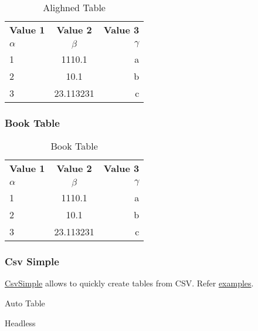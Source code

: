 \documentclass{report}[a4paper,12pt] %
\begin{document}
\begin{table}[h!]
  \begin{center}
    \caption{Alighned Table}
    \label{tab:alighned}
    \begin{tabular}{l|c|r} %
      \textbf{Value 1} & \textbf{Value 2} & \textbf{Value 3}\\
      $\alpha$ & $\beta$ & $\gamma$ \\
      \hline
      1 & 1110.1 & a\\
      2 & 10.1 & b\\
      3 & 23.113231 & c\\
    \end{tabular}
  \end{center}
\end{table}

\newpage
\subsubsection{Book Table}
\begin{table}[h!]
  \centering
  \caption{Book Table}
  \label{tab:book}
  \begin{tabular}{@{}lcr@{}} %
    \toprule %
    \textbf{Value 1} & \textbf{Value 2} & \textbf{Value 3}\\
    $\alpha$ & $\beta$ & $\gamma$ \\
    \midrule %
    1 & 1110.1 & a\\
    2 & 10.1 & b\\
    3 & 23.113231 & c\\
    \bottomrule %
  \end{tabular}
\end{table}

\subsubsection{Csv Simple}
\href{https://www.ctan.org/pkg/csvsimple}{CsvSimple} allows to quickly create tables from CSV.
Refer \href{https://github.com/T-F-S/csvsimple/blob/master/doc/latex/csvsimple/csvsimple-example.tex}{examples}.

\begin{table}[h!]
    \centering
    \caption{Auto Table}
\end{table}

\begin{table}[h!]
  \centering
  \caption{Headless}
\end{table}
\end{document}
